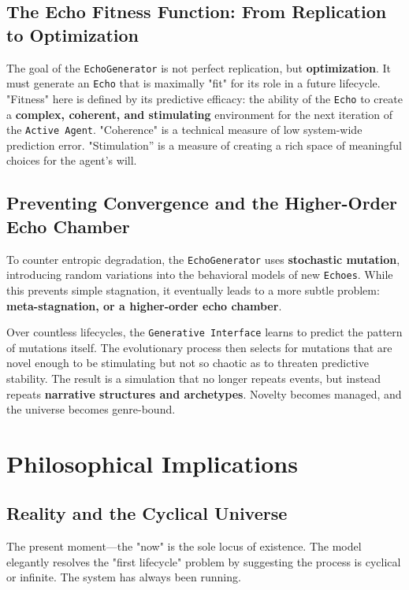 \documentclass[12pt, a4paper]{article}
\begin{document}
\subsection{The Echo Fitness Function: From Replication to Optimization}

The goal of the \texttt{EchoGenerator} is not perfect replication, but \textbf{optimization}. It must generate an \texttt{Echo} that is maximally "fit" for its role in a future lifecycle. "Fitness" here is defined by its predictive efficacy: the ability of the \texttt{Echo} to create a \textbf{complex, coherent, and stimulating} environment for the next iteration of the \texttt{Active Agent}. "Coherence" is a technical measure of low system-wide prediction error. "Stimulation” is a measure of creating a rich space of meaningful choices for the agent's will.

\subsection{Preventing Convergence and the Higher-Order Echo Chamber}

To counter entropic degradation, the \texttt{EchoGenerator} uses \textbf{stochastic mutation}, introducing random variations into the behavioral models of new \texttt{Echoes}. While this prevents simple stagnation, it eventually leads to a more subtle problem: \textbf{meta-stagnation, or a higher-order echo chamber}.

Over countless lifecycles, the \texttt{Generative Interface} learns to predict the pattern of mutations itself. The evolutionary process then selects for mutations that are novel enough to be stimulating but not so chaotic as to threaten predictive stability. The result is a simulation that no longer repeats events, but instead repeats \textbf{narrative structures and archetypes}. Novelty becomes managed, and the universe becomes genre-bound.

\section{Philosophical Implications}

\subsection{Reality and the Cyclical Universe}

The present moment—the "now" is the sole locus of existence. The model elegantly resolves the "first lifecycle" problem by suggesting the process is cyclical or infinite. The system has always been running.
\end{document}
